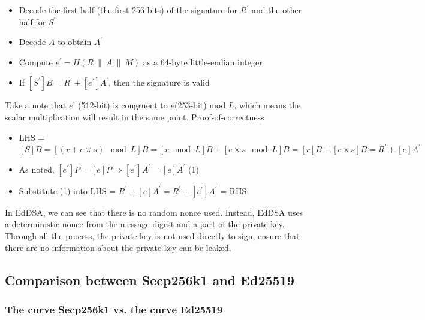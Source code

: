 \begin{itemize}
  \item Decode the first half (the first 256 bits) of the signature for $R^\prime$ and the other half for $S^\prime$
  \item Decode $A$ to obtain $A^\prime$
  \item Compute $e^\prime = H(R \ \| \ A \ \| \ M)$ as a 64-byte little-endian integer
  \item If $[S^\prime]B = R^\prime + [e^\prime]A^\prime$, then the signature is valid
\end{itemize}

Take a note that $e^\prime$ (512-bit) is congruent to $e$(253-bit) mod $L$, which means the scalar multiplication will result in the same point. Proof-of-correctness

\begin{itemize}
  \item LHS = $[S]B = [(r + e \times s) \mod L]B = [r \mod L]B + [e \times s \mod L]B = [r]B + [e \times s]B = R^\prime + [e]A^\prime$
  \item As noted, $[e^\prime]P = [e]P \Rightarrow [e^\prime]A^\prime = [e]A^\prime$ (1)
  \item Substitute (1) into LHS = $R^\prime + [e]A^\prime = R^\prime + [e^\prime]A^\prime$ = RHS
\end{itemize}

In EdDSA, we can see that there is no random nonce used. Instead, EdDSA uses a deterministic nonce from the message digest and a part of the private key. Through all the process, the private key is not used directly to sign, ensure that there are no information about the private key can be leaked.

\subsection{Comparison between Secp256k1 and Ed25519}

\subsubsection{The curve Secp256k1 vs. the curve Ed25519}

